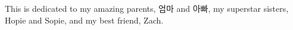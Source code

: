 
This is dedicated to my amazing parents, 엄마 and 아빠, my superstar sisters, Hopie and Sopie, and my best friend, Zach.
